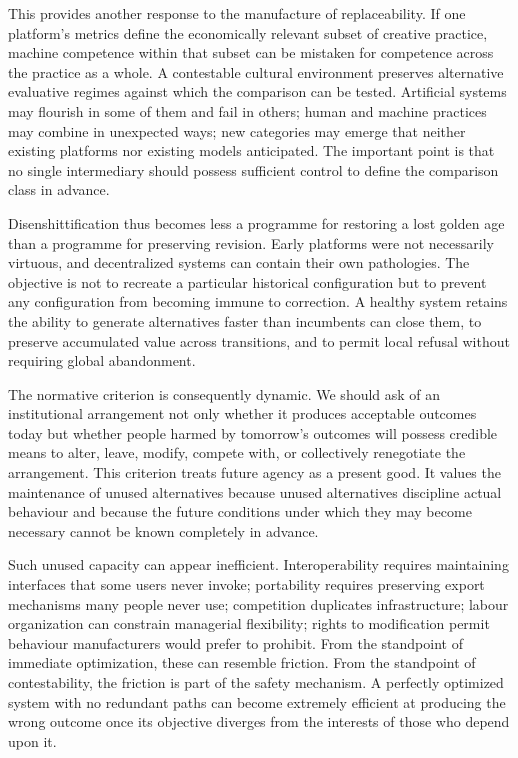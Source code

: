 \documentclass[11pt]{article}
\begin{document}
This provides another response to the manufacture of replaceability. If one platform's metrics define the economically relevant subset of creative practice, machine competence within that subset can be mistaken for competence across the practice as a whole. A contestable cultural environment preserves alternative evaluative regimes against which the comparison can be tested. Artificial systems may flourish in some of them and fail in others; human and machine practices may combine in unexpected ways; new categories may emerge that neither existing platforms nor existing models anticipated. The important point is that no single intermediary should possess sufficient control to define the comparison class in advance.

Disenshittification thus becomes less a programme for restoring a lost golden age than a programme for preserving revision. Early platforms were not necessarily virtuous, and decentralized systems can contain their own pathologies. The objective is not to recreate a particular historical configuration but to prevent any configuration from becoming immune to correction. A healthy system retains the ability to generate alternatives faster than incumbents can close them, to preserve accumulated value across transitions, and to permit local refusal without requiring global abandonment.

The normative criterion is consequently dynamic. We should ask of an institutional arrangement not only whether it produces acceptable outcomes today but whether people harmed by tomorrow's outcomes will possess credible means to alter, leave, modify, compete with, or collectively renegotiate the arrangement. This criterion treats future agency as a present good. It values the maintenance of unused alternatives because unused alternatives discipline actual behaviour and because the future conditions under which they may become necessary cannot be known completely in advance.

Such unused capacity can appear inefficient. Interoperability requires maintaining interfaces that some users never invoke; portability requires preserving export mechanisms many people never use; competition duplicates infrastructure; labour organization can constrain managerial flexibility; rights to modification permit behaviour manufacturers would prefer to prohibit. From the standpoint of immediate optimization, these can resemble friction. From the standpoint of contestability, the friction is part of the safety mechanism. A perfectly optimized system with no redundant paths can become extremely efficient at producing the wrong outcome once its objective diverges from the interests of those who depend upon it.
\end{document}
